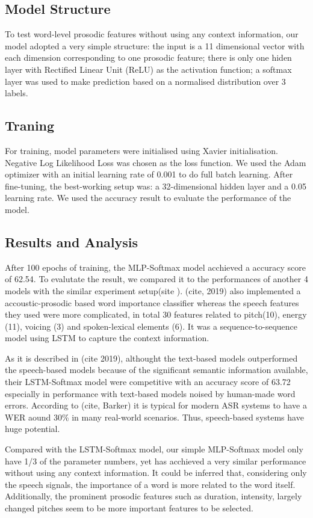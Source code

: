   \subsection{Model Structure}
  To test word-level prosodic features without using any context information, our model adopted a very simple structure: the input is a 11 dimensional vector with each dimension corresponding to one prosodic feature; there is only one hiden layer with Rectified Linear Unit (ReLU) as the activation function; a softmax layer was used to make prediction based on a normalised distribution over 3 labels.
 
 \subsection{Traning}
 For training, model parameters were initialised using Xavier initialisation. Negative Log Likelihood Loss was chosen as the loss function. We used the Adam optimizer with an initial learning rate of 0.001 to do full batch learning. After fine-tuning, the best-working setup was: a 32-dimensional hidden layer and a 0.05 learning rate. We used the accuracy result to evaluate the performance of the model. 
 
 \subsection{Results and Analysis}
After 100 epochs of training, the MLP-Softmax model acchieved a accuracy score of 62.54. To evalutate the result, we compared it to the performances of another 4 models with the similar experiment setup(site ). (cite, 2019) also implemented a accoustic-prosodic based word importance classifier whereas the speech features they used were more complicated, in total 30 features related to pitch(10), energy (11), voicing (3) and spoken-lexical elements (6). It was a sequence-to-sequence model using LSTM to capture the context information.

As it is described in (cite 2019), althought the text-based models outperformed the speech-based models because of the significant semantic information available, their LSTM-Softmax model were competitive with an accuracy score of 63.72 especially in performance with text-based models noised by human-made word errors. According to (cite, Barker) it is typical for modern ASR systems to have a WER aound 30\% in many real-world scenarios. Thus, speech-based systems have huge potential.

Compared with the LSTM-Softmax model, our simple MLP-Softmax model only have 1/3 of the parameter numbers, yet has acchieved a very similar performance without using any context information. It could be inferred that, considering only the speech signals, the importance of a word is more related to the word itself. Additionally, the prominent prosodic features such as duration, intensity, largely changed pitches seem to be more important features to be selected.
